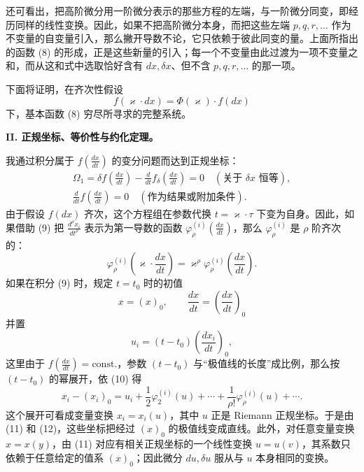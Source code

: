还可看出，把高阶微分用一阶微分表示的那些方程的左端，与一阶微分同变，即经历同样的线性变换。因此，如果不把高阶微分本身，而把这些左端 \(p,q,r,\ldots\) 作为不变量的自变量引入，那么撇开导数不论，它只依赖于彼此同变的量。上面所指出的函数 (8) 的形成，正是这些新量的引入；每一个不变量由此过渡为一项不变量之和，而从这和式中选取恰好含有 \(dx,\delta x\)、但不含 \(p,q,r,\ldots\) 的那一项。

下面将证明，在齐次性假设
\[
f(\varkappa\cdot dx)=\Phi(\varkappa)\cdot f(dx)
\]
下，基本函数 (8) 穷尽所寻求的完整系统。

\begin{center}
\textbf{II. 正规坐标、等价性与约化定理。}
\end{center}

我通过积分属于 \(f\!\left(\frac{dx}{dt}\right)\) 的变分问题而达到正规坐标：
\begin{equation}
\begin{gathered}
\Omega_1=\delta f\!\left(\frac{dx}{dt}\right)
-\frac{d}{dt}f_\delta\!\left(\frac{dx}{dt}\right)=0
\quad(\text{关于 }\delta x\text{ 恒等}),\\
\frac{d}{dt}f\!\left(\frac{dx}{dt}\right)=0
\quad(\text{作为结果或附加条件}).
\end{gathered}
\tag{9}
\end{equation}
由于假设 \(f(dx)\) 齐次，这个方程组在参数代换 \(t=\varkappa\cdot\tau\) 下变为自身。因此，如果借助 (9) 把
\(\frac{d^\rho x_i}{dt^\rho}\) 表示为第一导数的函数
\(\varphi_\rho^{(i)}\!\left(\frac{dx}{dt}\right)\)，那么 \(\varphi_\rho^{(i)}\) 是 \(\rho\) 阶齐次的：
\begin{equation}
\varphi_\rho^{(i)}\!\left(\varkappa\cdot\frac{dx}{dt}\right)
=\varkappa^\rho\varphi_\rho^{(i)}\!\left(\frac{dx}{dt}\right).
\tag{10}
\end{equation}
如果在积分 (9) 时，规定 \(t=t_0\) 时的初值
\[
x=(x)_0,\qquad \frac{dx}{dt}=\left(\frac{dx}{dt}\right)_0
\]
并置
\begin{equation}
u_i=(t-t_0)\left(\frac{dx_i}{dt}\right)_0,
\tag{11}
\end{equation}
这里由于 \(f\!\left(\frac{dx}{dt}\right)=\mathrm{const.}\)，参数
\((t-t_0)\) 与“极值线的长度”成比例，那么按 \((t-t_0)\) 的幂展开，依 (10) 得
\begin{equation}
x_i-(x_i)_0=u_i+\frac12\varphi_2^{(i)}(u)+\cdots+
\frac{1}{\rho!}\varphi_\rho^{(i)}(u)+\cdots .
\tag{12}
\end{equation}
这个展开可看成变量变换 \(x_i=x_i(u)\)，其中 \(u\) 正是 Riemann 正规坐标。于是由 (11) 和 (12)，这些坐标把经过 \((x)_0\) 的极值线变成直线。此外，对任意变量变换 \(x=x(y)\)，由 (11) 对应有相关正规坐标的一个线性变换 \(u=u(v)\)，其系数只依赖于任意给定的值系 \((x)_0\)；因此微分 \(du,\delta u\) 服从与 \(u\) 本身相同的变换。

